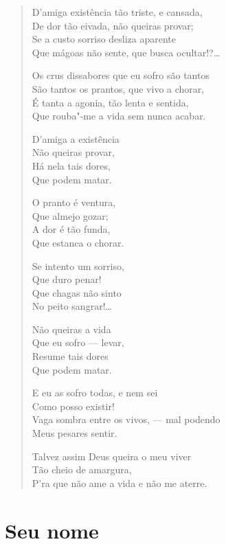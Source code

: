 \begin{verse}
D'amiga existência tão triste, e cansada,\\
De dor tão eivada, não queiras provar;\\
Se a custo sorriso desliza aparente\\
Que mágoas não sente, que busca ocultar!?\ldots{}

Os crus dissabores que eu sofro são tantos\\
São tantos os prantos, que vivo a chorar,\\
É tanta a agonia, tão lenta e sentida,\\
Que rouba"-me a vida sem nunca acabar.

D'amiga a existência\\
Não queiras provar,\\
Há nela tais dores,\\
Que podem matar.

O pranto é ventura,\\
Que almejo gozar;\\
A dor é tão funda,\\
Que estanca o chorar.

Se intento um sorriso,\\
Que duro penar!\\
Que chagas não sinto\\
No peito sangrar!\ldots{}

Não queiras a vida\\
Que eu sofro --- levar,\\
Resume tais dores\\
Que podem matar.

E eu as sofro todas, e nem sei\\
Como posso existir!\\
Vaga sombra entre os vivos, --- mal podendo\\
Meus pesares sentir.

Talvez assim Deus queira o meu viver\\
Tão cheio de amargura,\\
P'ra que não ame a vida e não me aterre.
\end{verse}

\chapter{Seu nome}

